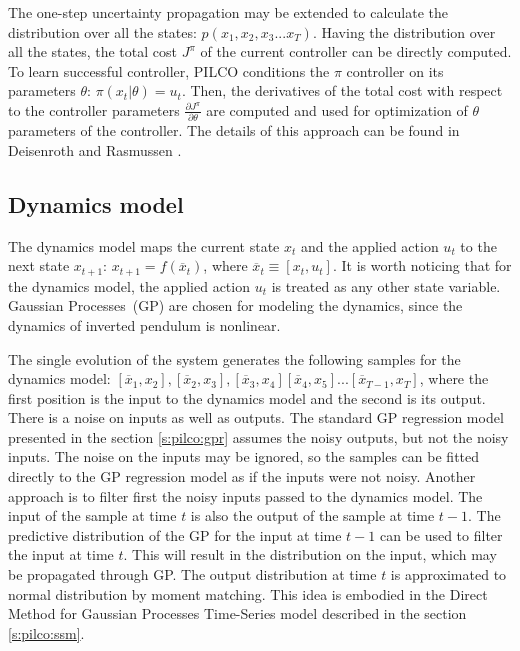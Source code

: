 \noindent The one-step uncertainty propagation may be extended to calculate the distribution over all the states: $p(x_{1}, x_{2}, x_{3}...x_{T})$. Having the distribution over all the states, the total cost $J^{\pi}$ of the current controller can be directly computed. To learn successful controller, PILCO conditions the $\pi$ controller on its parameters $\theta$: $\pi(x_{t}|\theta)=u_{t}$. Then, the derivatives of the total cost with respect to the controller parameters $\frac{\partial J^{\pi}}{\partial \theta}$ are computed and used for optimization of $\theta$ parameters of the controller. The details of this approach can be found in Deisenroth and Rasmussen \cite{deisenroth2011pilco}.

\subsection{Dynamics model}
\label{s:pilco:dyn}

The dynamics model maps the current state $x_{t}$ and the applied action $u_{t}$ to the next state $x_{t+1}$:  $x_{t+1}=f(\overline{x}_{t})$,  where $\overline{x}_{t} \equiv [x_{t}, u_{t}]$. It is worth noticing that for the dynamics model, the applied action $u_{t}$ is treated as any other state variable. Gaussian Processes\ (GP) are chosen for modeling the dynamics, since the dynamics of inverted pendulum is nonlinear.

\noindent The single evolution of the system generates the following samples for the dynamics model: $[\overline{x}_{1}, x_{2}], [\overline{x}_{2}, x_{3}], [\overline{x}_{3}, x_{4}] [\overline{x}_{4}, x_{5}]...[\overline{x}_{T-1}, x_{T}]$, where the first position is the input to the dynamics model and the second is its output. There is a noise on inputs as well as outputs. The standard GP regression model presented in the section \ref{s:pilco:gpr} assumes the noisy outputs, but not the noisy inputs. The noise on the inputs may be ignored, so the samples can be fitted directly to the GP regression model as if the inputs were not noisy. Another approach is to filter first the noisy inputs passed to the dynamics model. The input of the sample at time $t$ is also the output of the sample at time $t-1$. The predictive distribution of the GP for the input at time $t-1$ can be used to filter the input at time $t$. This will result in the distribution on the input, which may be propagated through GP. The output distribution at time $t$ is approximated to normal distribution by moment matching. This idea is embodied in the Direct Method for Gaussian Processes Time-Series model described in the section \ref{s:pilco:ssm}.

